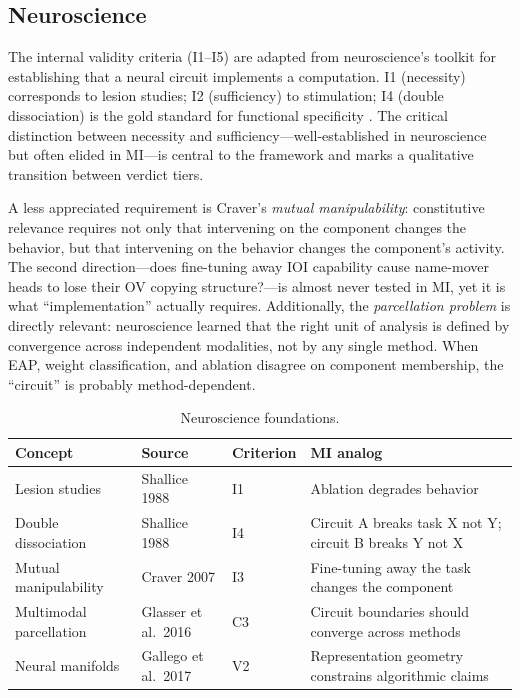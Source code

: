 \documentclass[10pt]{article}
\begin{document}
\subsection{Neuroscience}
\label{sec:neuro}

The internal validity criteria (I1--I5) are adapted from neuroscience's toolkit for establishing that a neural circuit implements a computation. I1 (necessity) corresponds to lesion studies; I2 (sufficiency) to stimulation; I4 (double dissociation) is the gold standard for functional specificity \citep{woodward2003making}. The critical distinction between necessity and sufficiency---well-established in neuroscience but often elided in MI---is central to the framework and marks a qualitative transition between verdict tiers.

A less appreciated requirement is Craver's \emph{mutual manipulability}: constitutive relevance requires not only that intervening on the component changes the behavior, but that intervening on the behavior changes the component's activity. The second direction---does fine-tuning away IOI capability cause name-mover heads to lose their OV copying structure?---is almost never tested in MI, yet it is what ``implementation'' actually requires. Additionally, the \emph{parcellation problem} is directly relevant: neuroscience learned that the right unit of analysis is defined by convergence across independent modalities, not by any single method. When EAP, weight classification, and ablation disagree on component membership, the ``circuit'' is probably method-dependent.

\begin{table}[H]
\centering\small
\caption{Neuroscience foundations.}
\renewcommand{\arraystretch}{1.12}
\begin{tabular}{@{}l>{\raggedright\arraybackslash}p{2cm}l>{\raggedright\arraybackslash}p{4.5cm}@{}}
\toprule
\textbf{Concept} & \textbf{Source} & \textbf{Criterion} & \textbf{MI analog} \\
\midrule
Lesion studies & Shallice 1988 & I1 & Ablation degrades behavior \\
\midrule
Double dissociation & Shallice 1988 & I4 & Circuit A breaks task X not Y; circuit B breaks Y not X \\
\midrule
Mutual manipulability & Craver 2007 & I3 & Fine-tuning away the task changes the component \\
\midrule
Multimodal parcellation & Glasser et al.\ 2016 & C3 & Circuit boundaries should converge across methods \\
\midrule
Neural manifolds & Gallego et al.\ 2017 & V2 & Representation geometry constrains algorithmic claims \\
\bottomrule
\end{tabular}
\end{table}
\end{document}
